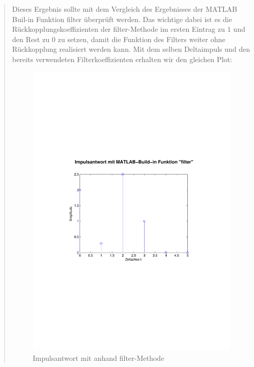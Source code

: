 \begin{quote}
	Dieses Ergebnis sollte mit dem Vergleich des Ergebnisses der MATLAB
	Buil-in Funktion filter überprüft werden. Das wichtige dabei ist es die
	Rückkopplungskoeffizienten der filter-Methode im ersten Eintrag zu $1$ und den
	Rest zu $0$ zu setzen, damit die Funktion des Filters weiter ohne Rückkopplung
	realisiert werden kann. Mit dem selben Deltaimpuls und den
	bereits verwendeten Filterkoeffizienten erhalten wir den gleichen Plot:
	
	\begin{figure}[H]
            \centering
                \includegraphics[scale=0.5, trim = 1cm 6cm 1.5cm 8cm,
                clip]{./Bilder/Impulsantwort_aufgabe11}
                    \caption{Impulsantwort mit anhand filter-Methode}
                    \label{fig:./Bilder/Impulsantwort_aufgabe11}
            \end{figure}
	
\end{quote}


